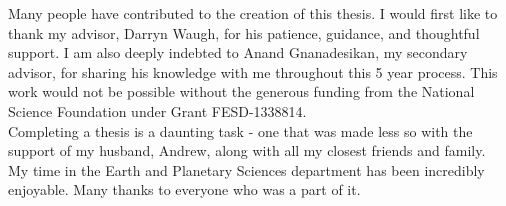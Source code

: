 \begin{acknowledgements}

Many people have contributed to the creation of this thesis. I would first like
to thank my advisor, Darryn Waugh, for his patience, guidance, and thoughtful
support. I am also deeply indebted to Anand Gnanadesikan, my secondary advisor,
for sharing his knowledge with me throughout this 5 year process. This work would
not be possible without the generous funding from the National Science Foundation
under Grant FESD-1338814. \\

Completing a thesis is a daunting task - one that was made less so with the
support of my husband, Andrew, along with all my closest friends and family.\\

My time in the Earth and Planetary Sciences department has been incredibly enjoyable.
Many thanks to everyone who was a part of it.

\end{acknowledgements}




